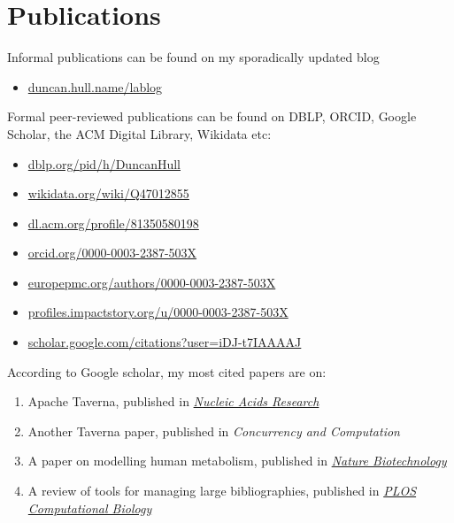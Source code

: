 \documentclass[
  12pt,
]{book}
\providecommand{\tightlist}{%
  \setlength{\itemsep}{0pt}\setlength{\parskip}{0pt}}
\begin{document}
\hypertarget{publications}{%
\section{Publications}\label{publications}}

Informal publications can be found on my sporadically updated blog

\begin{itemize}
\tightlist
\item
  \href{https://duncan.hull.name/lablog/}{duncan.hull.name/lablog}
\end{itemize}

Formal peer-reviewed publications can be found on DBLP, ORCID, Google Scholar, the ACM Digital Library, Wikidata etc:

\begin{itemize}
\tightlist
\item
  \href{https://dblp.org/pid/h/DuncanHull}{dblp.org/pid/h/DuncanHull}
\item
  \href{https://www.wikidata.org/wiki/Q47012855}{wikidata.org/wiki/Q47012855}
\item
  \href{https://dl.acm.org/profile/81350580198}{dl.acm.org/profile/81350580198}
\item
  \href{https://orcid.org/0000-0003-2387-503X}{orcid.org/0000-0003-2387-503X}
\item
  \href{https://europepmc.org/authors/0000-0003-2387-503X}{europepmc.org/authors/0000-0003-2387-503X}
\item
  \href{https://profiles.impactstory.org/u/0000-0003-2387-503X}{profiles.impactstory.org/u/0000-0003-2387-503X}
\item
  \href{https://scholar.google.com/citations?user=iDJ-t7IAAAAJ}{scholar.google.com/citations?user=iDJ-t7IAAAAJ}
\end{itemize}

According to Google scholar, my most cited papers are on:

\begin{enumerate}
\def\labelenumi{\arabic{enumi}.}
\tightlist
\item
  Apache Taverna, published in \href{https://en.wikipedia.org/wiki/Nucleic_Acids_Research}{\emph{Nucleic Acids Research}} \citep{taverna}\\
\item
  Another Taverna paper, published in \emph{Concurrency and Computation} \citep{Oinn2006}\\
\item
  A paper on modelling human metabolism, published in \href{https://en.wikipedia.org/wiki/Nature_Biotechnology}{\emph{Nature Biotechnology}} \citep{Thiele2013}
\item
  A review of tools for managing large bibliographies, published in \href{https://en.wikipedia.org/wiki/PLOS_Computational_Biology}{\emph{PLOS Computational Biology}} \citep{defrosting}
\end{enumerate}
\end{document}
